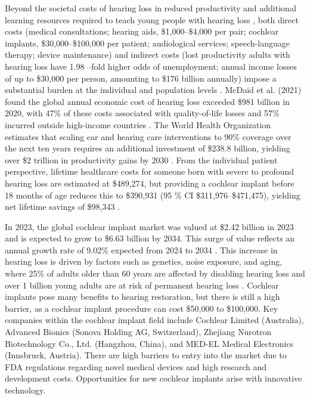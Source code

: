 \documentclass[referee,pdflatex, sn-vancouver-num]{sn-jnl}%
\theoremstyle{thmstyleone}%
\theoremstyle{thmstyletwo}%
\theoremstyle{thmstylethree}%
\DeclareRobustCommand{\textendash}{\ifmmode\text{-}\else\leavevmode\hbox{--}\fi}
\begin{document}
Beyond the societal costs of hearing loss in reduced productivity and additional learning resources required to teach young people with hearing loss \cite{SocietyCosts2000}, both direct costs (medical consultations; hearing aids, \$1,000--\$4,000 per pair; cochlear implants, \$30,000--\$100,000 per patient; audiological services; speech-language therapy; device maintenance) and indirect costs (lost productivity \textemdash adults with hearing loss have 1.98 \textendash fold higher odds of unemployment; annual income losses of up to \$30,000 per person, amounting to \$176 billion annually) impose a substantial burden at the individual and population levels \cite{SocietyCosts2000, Kim2020, Colburn2019, WHO2025, Battmer2010_ICR, Kim2020_JAMAOto_RevisionDeviceFailure, ANSI_AAMI_CI86_2017,FDA_Recognized_CI86}. McDaid et al. (2021) found the global annual economic cost of hearing loss exceeded \$981 billion in 2020, with 47\% of these costs associated with quality-of-life losses and 57\% incurred outside high-income countries \cite{McDaid2021}. The World Health Organization estimates that scaling ear and hearing care interventions to 90\% coverage over the next ten years requires an additional investment of \$238.8 billion, yielding over \$2 trillion in productivity gains by 2030 \cite{Tordrup2022}.  From the individual patient perspective, lifetime healthcare costs for someone born with severe to profound hearing loss are estimated at \$489,274, but providing a cochlear implant before 18 months of age reduces this to \$390,931 (95 \% CI \$311,976--\$471,475), yielding net lifetime savings of \$98,343 \cite{Cejas2024}.

In 2023, the global cochlear implant market was valued at \$2.42 billion in 2023 and is expected to grow to \$6.63 billion by 2034. This surge of value reflects an annual growth rate of 9.02\% expected from 2024 to 2034 \cite{globenewswire2025cochlear}. This increase in hearing loss is driven by factors such as genetics, noise exposure, and aging, where 25\% of adults older than 60 years are affected by disabling hearing loss and over 1 billion young adults are at risk of permanent hearing loss \cite{WHO2025}. Cochlear implants pose many benefits to hearing restoration, but there is still a high barrier, as a cochlear implant procedure can cost \$50,000 to \$100,000. Key companies within the cochlear implant field include Cochlear Limited (Australia), Advanced Bionics (Sonova Holding AG, Switzerland), Zhejiang Nurotron Biotechnology Co., Ltd. (Hangzhou, China), and MED-EL Medical Electronics (Innsbruck, Austria).  There are high barriers to entry into the market due to FDA regulations regarding novel medical devices and high research and development costs. Opportunities for new cochlear implants arise with innovative technology.
\end{document}
